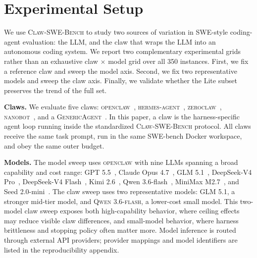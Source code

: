 \section{Experimental Setup}
\label{sec:experiments}

We use \textsc{Claw-SWE-Bench} to study two sources of variation in SWE-style coding-agent evaluation: the LLM, and the claw that wraps the LLM into an autonomous coding system. We report two complementary experimental grids rather than an exhaustive claw $\times$ model grid over all 350 instances. First, we fix a reference claw and sweep the model axis. Second, we fix two representative models and sweep the claw axis. Finally, we validate whether the Lite subset preserves the trend of the full set.

\textbf{Claws.}
We evaluate five claws: \textsc{openclaw}~\cite{steinberger_openclaw}, \textsc{hermes-agent}~\cite{nous_hermes_agent}, \textsc{zeroclaw}~\cite{zeroclaw_labs}, \textsc{nanobot}~\cite{hkuds_nanobot}, and a \textsc{GenericAgent}~\cite{generic_agent_2026}. In this paper, a claw is the harness-specific agent loop running inside the standardized \textsc{Claw-SWE-Bench} protocol. All claws receive the same task prompt, run in the same SWE-bench Docker workspace, and obey the same outer budget.

\textbf{Models.}
The model sweep uses \textsc{openclaw} with nine LLMs spanning a broad capability and cost range: GPT 5.5~\cite{openai_gpt_55}, Claude Opus 4.7~\cite{anthropic_claude_opus_47}, GLM 5.1~\cite{zai_glm_51}, DeepSeek-V4 Pro~\cite{deepseek_v4_pro}, DeepSeek-V4 Flash~\cite{deepseek_v4_flash}, Kimi 2.6~\cite{moonshot_kimi_k26}, Qwen 3.6-flash~\cite{alibaba_qwen36_flash}, MiniMax M2.7~\cite{minimax_m27}, and Seed 2.0-mini~\cite{bytedance_seed_20_mini}. The claw sweep uses two representative models: \textsc{GLM 5.1}, a stronger mid-tier model, and \textsc{Qwen 3.6-flash}, a lower-cost small model. This two-model claw sweep exposes both high-capability behavior, where ceiling effects may reduce visible claw differences, and small-model behavior, where harness brittleness and stopping policy often matter more. Model inference is routed through external API providers; provider mappings and model identifiers are listed in the reproducibility appendix.

